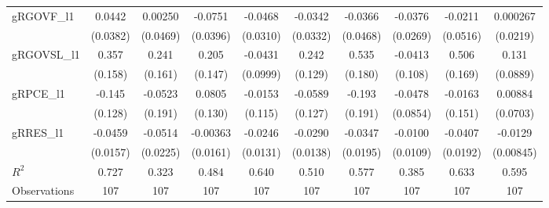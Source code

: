 {\begin{tabular}{l*{9}{c}}
gRGOVF_l1       &   0.0442         &  0.00250         &  -0.0751\sym{*}  &  -0.0468         &  -0.0342         &  -0.0366         &  -0.0376         &  -0.0211         & 0.000267         \\
                & (0.0382)         & (0.0469)         & (0.0396)         & (0.0310)         & (0.0332)         & (0.0468)         & (0.0269)         & (0.0516)         & (0.0219)         \\
gRGOVSL_l1      &    0.357\sym{**} &    0.241         &    0.205         &  -0.0431         &    0.242\sym{*}  &    0.535\sym{***}&  -0.0413         &    0.506\sym{***}&    0.131         \\
                &  (0.158)         &  (0.161)         &  (0.147)         & (0.0999)         &  (0.129)         &  (0.180)         &  (0.108)         &  (0.169)         & (0.0889)         \\
gRPCE_l1        &   -0.145         &  -0.0523         &   0.0805         &  -0.0153         &  -0.0589         &   -0.193         &  -0.0478         &  -0.0163         &  0.00884         \\
                &  (0.128)         &  (0.191)         &  (0.130)         &  (0.115)         &  (0.127)         &  (0.191)         & (0.0854)         &  (0.151)         & (0.0703)         \\
gRRES_l1        &  -0.0459\sym{***}&  -0.0514\sym{**} & -0.00363         &  -0.0246\sym{*}  &  -0.0290\sym{**} &  -0.0347\sym{*}  &  -0.0100         &  -0.0407\sym{**} &  -0.0129         \\
                & (0.0157)         & (0.0225)         & (0.0161)         & (0.0131)         & (0.0138)         & (0.0195)         & (0.0109)         & (0.0192)         &(0.00845)         \\
\midrule
\(R^{2}\)       &    0.727         &    0.323         &    0.484         &    0.640         &    0.510         &    0.577         &    0.385         &    0.633         &    0.595         \\
Observations    &      107         &      107         &      107         &      107         &      107         &      107         &      107         &      107         &      107         \\
\bottomrule
\end{tabular}
}
